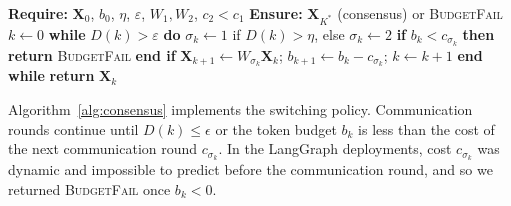 \documentclass[journal,twoside,web]{ieeecolor_no_firstpage_logo}
\begin{document}
\begin{algorithm}[H]
\caption{Norm-Threshold Adaptive Consensus}\label{alg:consensus}
\begin{algorithmic}
\STATE \textbf{Require:} $\mathbf{X}_0$, $b_0$, $\eta$, $\varepsilon$, $W_1,W_2$, $c_2<c_1$
\STATE \textbf{Ensure:} $\mathbf{X}_{K^*}$ (consensus) or \textsc{BudgetFail}
\STATE \hspace{0.5cm}$k\gets0$
\STATE \hspace{0.5cm}\textbf{while} {$D(k)>\varepsilon$} \textbf{do}
  \STATE \hspace{1cm}$\sigma_k\gets1$ if $D(k)>\eta$, else $\sigma_k\gets2$
  \STATE\hspace{1cm}\textbf{if} {$b_k<c_{\sigma_k}$} \textbf{then return} \textsc{BudgetFail}
  \STATE \hspace{1cm}\textbf{end if}
  \STATE \hspace{1cm}$\mathbf{X}_{k+1}\gets W_{\sigma_k}\mathbf{X}_k$;\;
         $b_{k+1}\gets b_k-c_{\sigma_k}$;\;
         $k\gets k+1$
\STATE \hspace{0.5cm}\textbf{end while}
\STATE \hspace{0.5cm}\textbf{return} $\mathbf{X}_k$
\end{algorithmic}
\end{algorithm}
Algorithm~\ref{alg:consensus} implements the switching policy. Communication rounds continue until $D(k) \leq \epsilon $ or the token budget $b_k $ is less than the cost of the next communication round $c_{\sigma_k}.$ In the LangGraph deployments, cost $c_{\sigma_k}$ was dynamic and impossible to predict before the communication round, and so we returned \textsc{BudgetFail} once $b_k < 0.$
\end{document}
